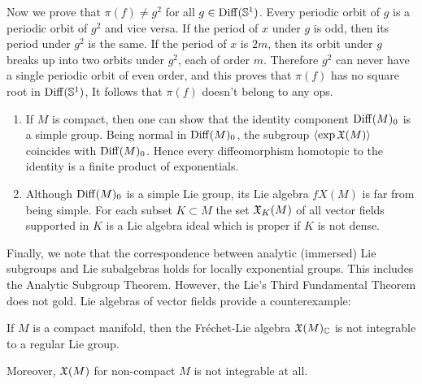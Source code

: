 \begin{example}
    Now we prove that $\pi(f)\neq g^2$ for all $g\in\operatorname{Diff}(\mathbb{S}^1)$. Every periodic orbit of $g$ is a periodic  orbit of $g^2$ and vice versa. If the period of $x$ under $g$ is odd, then its period under $g^2$ is the same. If the period of $x$ is $2m$, then its orbit under $g$ breaks up into two orbits under $g^2$, each of order $m$. Therefore $g^2$ can never have a single periodic orbit of even order, and this proves that $\pi(f)$ has no square root in $\operatorname{Diff}(\mathbb{S}^1)$, It follows that $\pi(f)$ doesn't belong to any \gls{ops}.
\end{example}

\begin{rem}
    \begin{enumerate}[label=(\alph*)]
        \item If $M$ is compact, then one can show that the identity component $\operatorname{Diff}(M)_0$ is a simple group. Being normal in $\operatorname{Diff}(M)_0$, the subgroup $\langle\exp\mathfrak{X}(M)\rangle$ coincides with $\operatorname{Diff}(M)_0$. Hence every diffeomorphism homotopic to the identity is a finite product of exponentials.
        \item  Although $\operatorname{Diff}(M)_0$ is a simple Lie group, its Lie algebra $fX(M)$ is far from being simple. For each subset $K\subset M$ the set $\mathfrak{X}_K(M)$ of all vector fields supported in $K$ is a Lie algebra ideal which is proper if $K$ is not dense.
    \end{enumerate}
\end{rem}

Finally, we note that the correspondence between analytic (immersed) Lie subgroups and Lie subalgebras holds for locally exponential groups. This includes the Analytic Subgroup Theorem. However, the Lie's Third Fundamental Theorem does not gold. Lie algebras of vector fields provide a counterexample:
\begin{thm}[Lempert]
    If $M$ is a compact manifold, then the Fr\'echet-Lie algebra $\mathfrak{X}(M)_{\mathbb{C}}$ is not integrable to a regular Lie group.
\end{thm}
Moreover, $\mathfrak{X}(M)$ for non-compact $M$ is not integrable at all.


